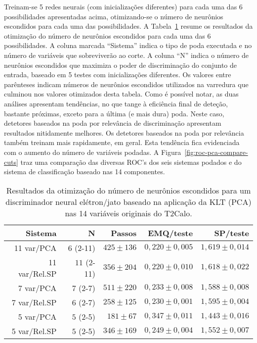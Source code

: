 Treinam-se 5 redes neurais (com inicializações diferentes) para cada uma das 6
possibilidades apresentadas acima, otimizando-se o número de neurônios
escondidos para cada uma das possibilidades. A
Tabela~\ref{tab:pca-cuts-hidden} resume os resultados da otimização do número
de neurônios escondidos para cada uma das 6 possibilidades. A coluna marcada
``Sistema'' indica o tipo de poda executada e no número de variáveis que
sobreviverão ao corte. A coluna ``N'' indica o número de neurônios escondidos
que maximiza o poder de discriminação do conjunto de entrada, baseado em 5
testes com inicializações diferentes. Os valores entre parênteses indicam
números de neurônios escondidos utilizados na varredura que culminou nos
valores otimizados desta tabela. Como é possível notar, as duas análises
apresentam tendências, no que tange à eficiência final de deteção, bastante
próximas, exceto para a última (e mais dura) poda. Neste caso, detetores
baseados na poda por relevância de discriminação apresentam resultados
nitidamente melhores. Os detetores baseados na poda por relevância também
treinam mais rapidamente, em geral. Esta tendência fica evidenciada com o
aumento do número de variáveis podadas. A
Figura~\ref{fig:roc-pca-compare-cuts} traz uma comparação das diversas ROC's
dos seis sistemas podados e do sistema de classificação baseado nas 14
componentes.

\begin{table}
\caption{Resultados da otimização do número de neurônios escondidos para um
discriminador neural elétron/jato baseado na aplicação da KLT (PCA) nas 14
variáveis originais do T2Calo.}
\label{tab:pca-cuts-hidden}
\begin{center}
\begin{tabular}{|r|r|r|r|r|} \hline
Sistema & N & Passos & EMQ/teste & SP/teste \\ \hline \hline
11 var/PCA & $6$ (2-11) & $425\pm136$ & $0,220\pm0,005$ & $1,619\pm0,014$ \\
\hline  
11 var/Rel.SP & $11$ (2-11) & $356\pm204$ & $0,220\pm0,010$ & $1,618\pm0,022$
\\ \hline  
7 var/PCA & $7$ (2-7) & $511\pm220$ & $0,233\pm0,008$ & $1,588\pm0,008$ \\
\hline  
7 var/Rel.SP & $6$ (2-7) & $258\pm125$ & $0,230\pm0,001$ & $1,595\pm0,004$ \\
\hline  
5 var/PCA & $5$ (2-5) & $181\pm67$ & $0,347\pm0,011$ & $1,443\pm0,016$ \\
\hline  
5 var/Rel.SP & $5$ (2-5) & $346\pm169$ & $0,249\pm0,004$ & $1,552\pm0,007$ \\
\hline  
\end{tabular}
\end{center}
\end{table}


